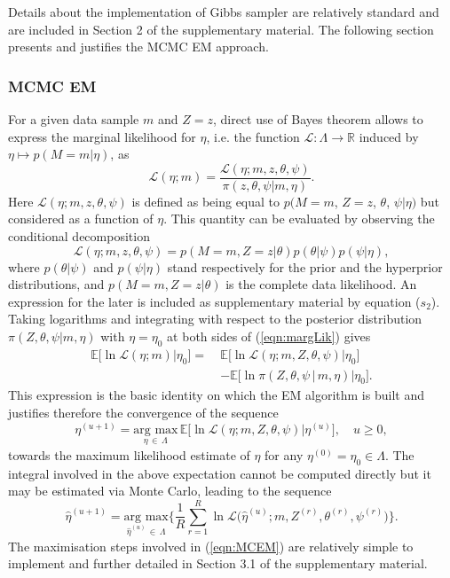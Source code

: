 \documentclass{bioinfo}
\begin{document}
Details about the implementation of Gibbs sampler are relatively
standard and are included in Section 2 of the supplementary
material. The following section presents and justifies the MCMC EM
approach.

\subsubsection{MCMC EM}\label{sec:MCMCEM}
For a given data sample $m$ and $Z = z$, direct use of Bayes theorem
allows to  express the marginal likelihood for $\eta$, i.e. the
function $\mathcal L: \Lambda \to \mathbb R$ induced by $\eta
\mapsto p(M=m|\eta)$, as
\begin{equation}
  \label{eqn:margLik}
  \mathcal L(\eta; m)
  = \frac{\mathcal L(\eta; m, z, \theta, \psi)}{\pi(z,
      \theta, \psi|m, \eta)}.
\end{equation}
Here $\mathcal L(\eta; m, z, \theta, \psi)$ is
defined as being equal to  $p(M=m$, $Z=z$, $\theta$,
$\psi|\eta)$ but considered as a function of $\eta$.  This quantity
can be evaluated by observing the conditional decomposition
\[
   \mathcal L(\eta; m, z, \theta, \psi)
  =
   p(M=m, Z=z|\theta) p(\theta|\psi)p(\psi|\eta),
\]
where $p(\theta|\psi)$ and $p(\psi|\eta)$ stand respectively for the
prior and the hyperprior distributions, and $p(M=m, Z=z|\theta)$ is the
complete data likelihood. An expression for the later is included as
supplementary material by equation ($s_2$). Taking
logarithms and integrating with respect to the posterior distribution
$\pi(Z, \theta, \psi|m, \eta)$ with $\eta = \eta_0$ at both sides of
(\ref{eqn:margLik}) gives
\begin{align*}
   \mathbb E\big[\ln\mathcal L(\eta; m) \big| \eta_0\big]
  =\ &
  \mathbb E\big[\ln\mathcal L(\eta; m, Z, \theta, \psi)
    \big|  \eta_0\big]\\
     &-
  \mathbb E\big[\ln \pi(Z, \theta, \psi\,|\,m,\eta)\big| \eta_0\big].
\end{align*}
This expression is the basic identity on which the EM algorithm is
built and justifies therefore the convergence of the sequence
\begin{equation}
 \label{eqn:EofMCEM}
  \eta^{(u+1)} = \underset{\eta\,\in\, \Lambda}{\text{arg max}}\,
  \mathbb E\Big[\ln\mathcal L(\eta; m, Z, \theta, \psi)\big|
  \eta^{(u)}\Big],
  \quad u\geq 0,
\end{equation}
towards the maximum likelihood estimate of $\eta$ for any $\eta^{(0)}
= \eta_0  \in \Lambda$. The integral involved in the above expectation
cannot be computed directly but it may be estimated via Monte Carlo,
leading to the sequence
\begin{equation}
 \label{eqn:MCEM}
   \hat\eta^{(u+1)}
 =
    \underset{\hat\eta^{(u)}\,\in\,\Lambda}{\text{arg max}}
   \bigg\{
    \frac{1}{R}\sum_{r=1}^R
      \ln\mathcal L\Big(\hat\eta^{(u)}; m, Z^{(r)}, \theta^{(r)},
      \psi^{(r)}\Big)
   \bigg\}.
\end{equation}
The maximisation steps involved in (\ref{eqn:MCEM}) are relatively
simple to implement and further detailed in Section 3.1 of the
supplementary material.
\end{document}

